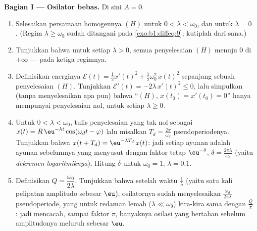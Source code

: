 \begin{problem}
\medskip
\noindent\textbf{Bagian I --- Osilator bebas.} Di sini $A = 0$.
\begin{enumerate}
  \item Selesaikan persamaan homogennya $(H)$ untuk $0 < \lambda <
        \omega_0$, dan untuk $\lambda = 0$. (Regim $\lambda
        \geq \omega_0$ sudah ditangani pada \cref{exo:b1:diffeq:9};
        kutiplah dari sana.)
  \item Tunjukkan bahwa untuk setiap $\lambda > 0$, semua penyelesaian $(H)$
        menuju $0$ di $+\infty$ --- pada ketiga regimnya.
  \item Definisikan energinya $\mathcal E(t) = \frac12 x'(t)^2 +
        \frac12\omega_0^2\,x(t)^2$ sepanjang sebuah penyelesaian $(H)$. Tunjukkan
        $\mathcal E'(t) = -2\lambda\,x'(t)^2 \leq 0$, lalu simpulkan
        (tanpa menyelesaikan apa pun) bahwa 
        ``$(H)$, $x(t_0) = x'(t_0) = 0$'' hanya mempunyai penyelesaian
        nol, untuk setiap $\lambda \geq 0$.
  \item Untuk $0 < \lambda < \omega_0$, tulis penyelesaian yang tak nol sebagai
        $x(t) = R\,\eu^{-\lambda t}\cos(\omega_d t - \varphi)$ lalu
        misalkan $T_d = \frac{2\pi}{\omega_d}$ pseudoperiodenya.
        Tunjukkan bahwa $x(t + T_d) = \eu^{-\lambda T_d}\,x(t)$: jadi setiap
        ayunan adalah ayunan sebelumnya yang menyusut dengan faktor tetap
        $\eu^{-\delta}$, $\delta = \frac{2\pi\lambda}{\omega_d}$
        (yaitu \emph{dekremen logaritmiknya}). Hitung $\delta$ untuk
        $\omega_0 = 1$, $\lambda = 0.1$.
  \item Definisikan \emph{} $Q =
        \dfrac{\omega_0}{2\lambda}$. Tunjukkan
        bahwa setelah waktu $\frac1\lambda$ (yaitu satu kali pelipatan
        amplitudo sebesar $\eu$), osilatornya sudah menyelesaikan
        $\frac{\omega_d}{2\pi\lambda}$ pseudoperiode, yang untuk
        redaman lemah ($\lambda \ll \omega_0$) kira-kira sama dengan
        $\frac Q\pi$: jadi  mencacah, sampai faktor $\pi$,
        banyaknya osilasi yang bertahan sebelum amplitudonya meluruh sebesar
        $\eu$.
\end{enumerate}


\end{problem}
